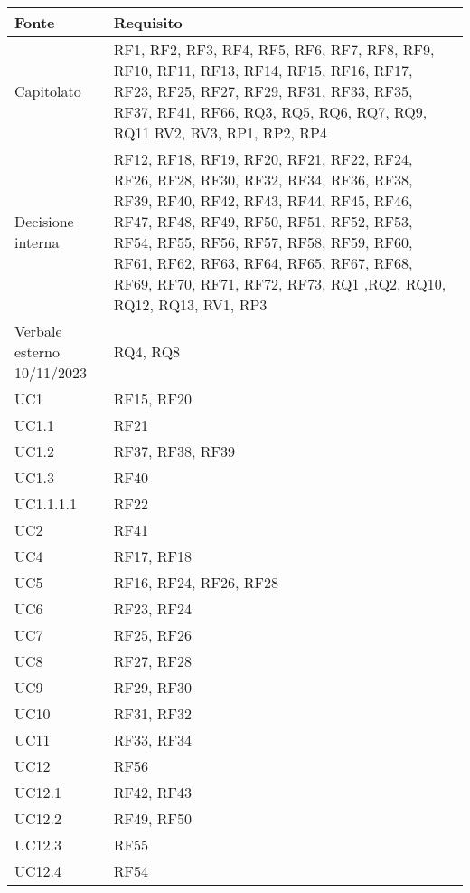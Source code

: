\begin{center}
    \begin{longtable}{|C{5cm}|C{5cm}|}
        \hline
        \textbf{Fonte} & \textbf{Requisito} \\
        \hline
        Capitolato & RF1, RF2, RF3, RF4, RF5, RF6, RF7, RF8, RF9, RF10, RF11, RF13, RF14, RF15, RF16, RF17, RF23, RF25, RF27, RF29, RF31, RF33, RF35, RF37, RF41, RF66, RQ3, RQ5, RQ6, RQ7, RQ9, RQ11 RV2, RV3, RP1, RP2, RP4  \\
        \hline
        Decisione interna & RF12, RF18, RF19, RF20, RF21, RF22, RF24, RF26, RF28, RF30, RF32, RF34, RF36, RF38, RF39, RF40, RF42, RF43, RF44, RF45, RF46, RF47, RF48, RF49, RF50, RF51, RF52, RF53, RF54, RF55, RF56, RF57, RF58, RF59, RF60, RF61, RF62, RF63, RF64, RF65, RF67, RF68, RF69, RF70, RF71, RF72, RF73, RQ1 ,RQ2, RQ10, RQ12, RQ13, RV1, RP3 \\
        \hline
        Verbale esterno 10/11/2023 & RQ4, RQ8 \\
        \hline
        UC1 & RF15, RF20 \\
        \hline
        UC1.1 & RF21 \\
        \hline
        UC1.2 & RF37, RF38, RF39 \\
        \hline
        UC1.3 & RF40 \\
        \hline
        UC1.1.1.1 & RF22 \\
        \hline
        UC2 & RF41 \\
        \hline
        UC4 & RF17, RF18 \\
        \hline
        UC5 & RF16, RF24, RF26, RF28\\
        \hline
        UC6 & RF23, RF24\\
        \hline
        UC7 & RF25, RF26 \\
        \hline
        UC8 & RF27, RF28 \\
        \hline
        UC9 & RF29, RF30 \\
        \hline
        UC10 & RF31, RF32 \\
        \hline
        UC11 & RF33, RF34 \\
        \hline
        UC12 & RF56 \\
        \hline
        UC12.1 & RF42, RF43 \\
        \hline
        UC12.2 & RF49, RF50 \\
        \hline
        UC12.3 & RF55 \\
        \hline
        UC12.4 & RF54 \\

\end{longtable}
\end{center}

